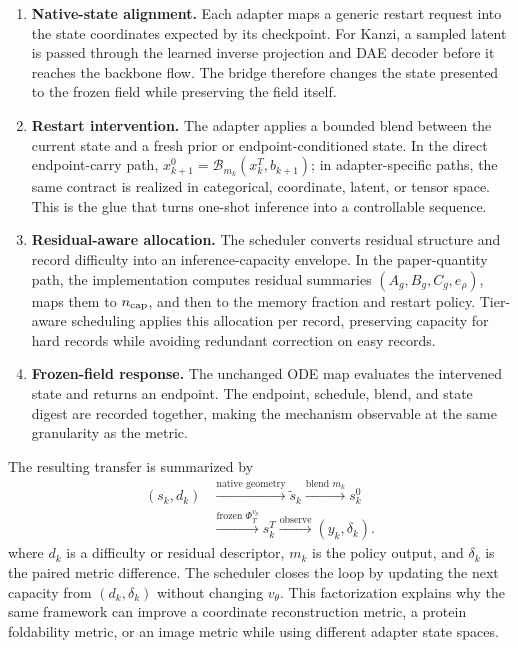 \documentclass[journal,twocolumn,final]{IEEEtran}
\begin{document}
\begin{enumerate}
\setlength{\itemsep}{2pt}
\item \textbf{Native-state alignment.} Each adapter maps a generic restart request into the state coordinates expected by its checkpoint. For Kanzi, a sampled latent is passed through the learned inverse projection and DAE decoder before it reaches the backbone flow. The bridge therefore changes the state presented to the frozen field while preserving the field itself.
\item \textbf{Restart intervention.} The adapter applies a bounded blend between the current state and a fresh prior or endpoint-conditioned state. In the direct endpoint-carry path, $x_{k+1}^{0}=\mathcal{B}_{m_k}(x_k^T,b_{k+1})$; in adapter-specific paths, the same contract is realized in categorical, coordinate, latent, or tensor space. This is the glue that turns one-shot inference into a controllable sequence.
\item \textbf{Residual-aware allocation.} The scheduler converts residual structure and record difficulty into an inference-capacity envelope. In the paper-quantity path, the implementation computes residual summaries $(A_g,B_g,C_g,e_\rho)$, maps them to $n_{\rm cap}$, and then to the memory fraction and restart policy. Tier-aware scheduling applies this allocation per record, preserving capacity for hard records while avoiding redundant correction on easy records.
\item \textbf{Frozen-field response.} The unchanged ODE map evaluates the intervened state and returns an endpoint. The endpoint, schedule, blend, and state digest are recorded together, making the mechanism observable at the same granularity as the metric.
\end{enumerate}

The resulting transfer is summarized by
\begin{equation}
\begin{aligned}
(s_k,d_k)&\xrightarrow{\text{native geometry}}\tilde s_k
\xrightarrow{\text{blend }m_k} s_k^0\\
&\xrightarrow{\text{frozen }\Phi_T^{v_\theta}} s_k^T
\xrightarrow{\text{observe}} (y_k,\delta_k).
\end{aligned}
\end{equation}
where $d_k$ is a difficulty or residual descriptor, $m_k$ is the policy output, and $\delta_k$ is the paired metric difference. The scheduler closes the loop by updating the next capacity from $(d_k,\delta_k)$ without changing $v_\theta$. This factorization explains why the same framework can improve a coordinate reconstruction metric, a protein foldability metric, or an image metric while using different adapter state spaces.
\end{document}
